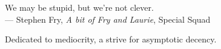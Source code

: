 \thispagestyle{empty}
{}

\vspace*{3cm}

\begin{center}
    We may be stupid, but we're not clever. \\ \medskip
    --- Stephen Fry, \emph{A bit of Fry and Laurie}, Special Squad    
\end{center}

\medskip

\begin{center}
    Dedicated to mediocrity, a strive for asymptotic decency. \\ \smallskip
\end{center}
